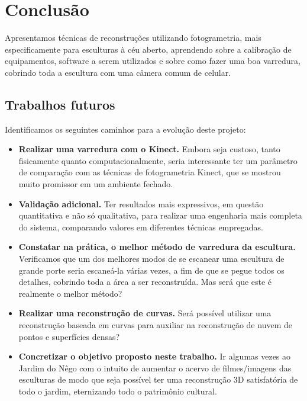 \chapter{Conclusão}
Apresentamos técnicas de reconstruções utilizando fotogrametria, mais especificamente para esculturas à céu aberto, aprendendo sobre a calibração de equipamentos, software a serem utilizados e sobre como fazer uma boa varredura, cobrindo toda a escultura com uma câmera comum de celular.

\section*{Trabalhos futuros} Identificamos os seguintes caminhos para a evolução deste projeto:
\begin{itemize}
\item \textbf{Realizar uma varredura com o Kinect.} Embora seja custoso, tanto fisicamente quanto computacionalmente, seria interessante ter um parâmetro de comparação com as técnicas de fotogrametria Kinect, que se mostrou muito promissor em um ambiente fechado.
\item \textbf{Validação adicional.} Ter resultados mais expressivos, em questão quantitativa e não só qualitativa, para realizar uma engenharia mais completa do sistema, comparando valores em diferentes técnicas empregadas.
\item \textbf{Constatar na prática, o melhor método de varredura da escultura.} Verificamos que um dos melhores modos de se escanear uma escultura de grande porte seria escaneá-la várias vezes, a fim de que se pegue todos os detalhes, cobrindo toda a área a ser reconstruída. Mas será que este é realmente o melhor método? 
\item \textbf{Realizar uma reconstrução de curvas.} Será possível utilizar uma reconstrução baseada em curvas para auxiliar na reconstrução de nuvem de pontos e superfícies densas?
\item \textbf{Concretizar o objetivo proposto neste trabalho.} Ir algumas vezes ao Jardim do Nêgo com o intuito de aumentar o acervo de filmes/imagens das esculturas de modo que seja possível ter uma reconstrução 3D satisfatória de todo o jardim, eternizando todo o patrimônio cultural.
\end{itemize}
